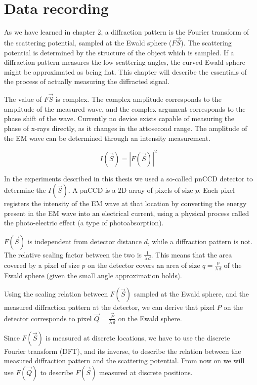 \chapter{Data recording}
As we have learned in chapter 2, a diffraction pattern is the Fourier transform of the scattering potential, sampled at the Ewald sphere ($F{\vec{S}}$). The scattering potential is determined by the structure of the object which is sampled. If a diffraction pattern measures the low scattering angles, the curved Ewald sphere might be approximated as being flat. This chapter will describe the essentials of the process of actually measuring the diffracted signal.

The value of $F{\vec{S}}$ is complex. The complex amplitude corresponds to the amplitude of the measured wave, and the complex argument corresponds to the phase shift of the wave.
Currently no device exists capable of measuring the phase of x-rays directly, as it changes in the attosecond range. The amplitude of the EM wave can be determined through an intensity measurement. 

\begin{equation}
I(\vec{S}) = |F(\vec{S})|^2
\end{equation}

In the experiments described in this thesis we used a so-called pnCCD detector to determine the $I(\vec{S})$. A pnCCD is a 2D array of pixels of size $p$. Each pixel registers the intensity of the EM wave at that location by converting the energy present in the EM wave into an electrical current, using a physical process called the photo-electric effect (a type of photoabsorption). 

$F(\vec{S})$ is independent from detector distance $d$, while a diffraction pattern is not. The relative scaling factor between the two is $\frac{1}{\lambda\,d}$. This means that the area covered by a pixel of size $p$ on the detector covers an area of size $q = \frac{p}{\lambda \, d}$ of the Ewald sphere (given the small angle approximation holds). 


Using the scaling relation between $F(\vec{S})$ sampled at the Ewald sphere, and the measured diffraction pattern at the detector, we can derive that pixel $P$ on the detector corresponds to pixel $\vec{Q} = \frac{\vec{P}}{\lambda\,d}$ on the Ewald sphere. 

Since $F(\vec{S})$ is measured at discrete locations, we have to use the discrete Fourier transform (DFT), and its inverse, to describe the relation between the measured diffraction pattern and the scattering potential. From now on we will use $F(\vec{Q})$ to describe $F(\vec{S})$ measured at discrete positions. 

